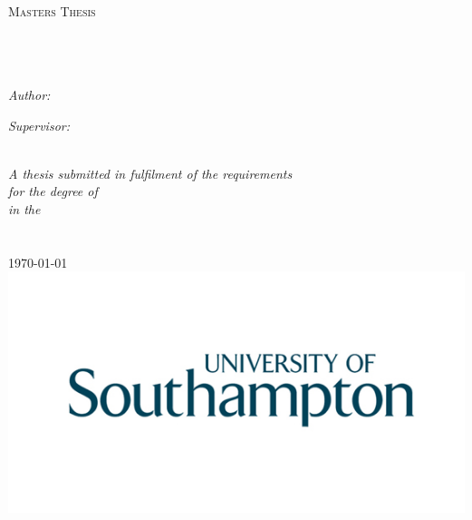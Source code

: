 \documentclass[
11pt, %
english, %
singlespacing, %
headsepline, %
]{MastersDoctoralThesis} %
\begin{document}

\begin{titlepage}
\begin{center}

\textsc{\LARGE \univname}\\[1.5cm] %
\textsc{\Large Masters Thesis}\\[0.5cm] %

\HRule \\[0.4cm] %
{\huge \bfseries \ttitle}\\[0.4cm] %
\HRule \\[1.5cm] %
 
\begin{minipage}{0.4\textwidth}
\begin{flushleft} \large
\emph{Author:}\\
{\authorname} %
\end{flushleft}
\end{minipage}
\begin{minipage}{0.4\textwidth}
\begin{flushright} \large
\emph{Supervisor:} \\
{\supname} %
\end{flushright}
\end{minipage}\\[3cm]
 
\large \textit{A thesis submitted in fulfilment of the requirements\\ for the degree of \degreename}\\[0.3cm] %
\textit{in the}\\[0.4cm]
\groupname\\\deptname\\[2cm] %
 
{\large \today}\\[4cm] %
\includegraphics[width = 0.3\linewidth]{Figures/southamptonLogo} %
 
\end{center}
\end{titlepage}
\end{document}
